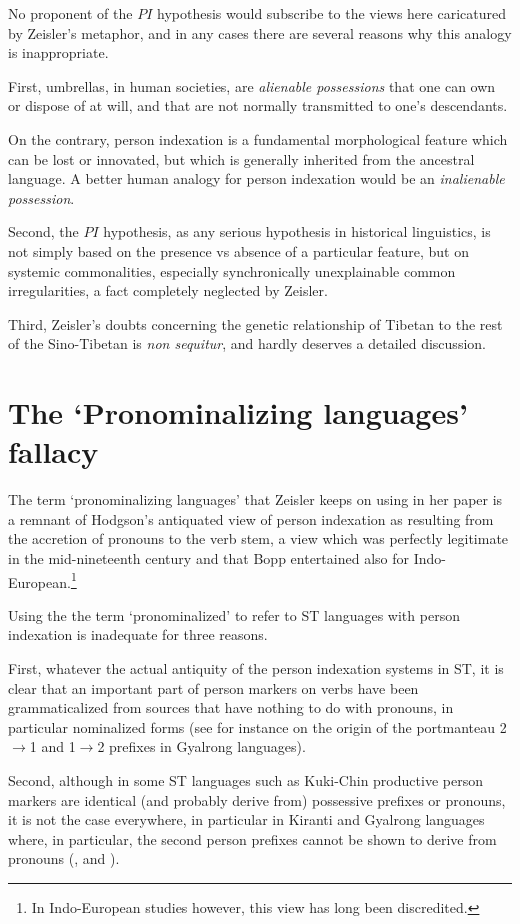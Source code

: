 \documentclass[oldfontcommands,oneside,a4paper,11pt]{article}
\begin{document}
No proponent of the $PI$ hypothesis would subscribe to the views here caricatured by Zeisler's metaphor, and in any cases there are several reasons why this analogy is inappropriate. 

First, umbrellas, in human societies, are \textit{alienable possessions} that one can own or dispose of at will, and that are not normally transmitted to one's descendants.

On the contrary, person indexation is a fundamental morphological feature which can be lost or innovated, but which is generally inherited from the ancestral language. A better human analogy for person indexation would be an \textit{inalienable possession}.

Second, the $PI$ hypothesis, as any serious hypothesis in historical linguistics, is not simply based on the presence vs absence of a particular feature, but on systemic commonalities, especially synchronically unexplainable common irregularities, a fact completely neglected by Zeisler.

Third, Zeisler's doubts concerning the genetic relationship of Tibetan to the rest of the Sino-Tibetan is \textit{non sequitur}, and hardly deserves a detailed discussion.


\section{The `Pronominalizing languages' fallacy}
The term `pronominalizing languages' that Zeisler keeps on using in her paper is a remnant of Hodgson's antiquated view of person indexation as resulting from the accretion of pronouns to the verb stem, a view which was perfectly legitimate in the mid-nineteenth century and that Bopp entertained also for Indo-European.\footnote{In Indo-European studies however, this view has long been discredited. }

Using the the term `pronominalized' to refer to ST languages with person indexation is inadequate for three reasons.

First, whatever the actual antiquity of the person indexation systems in ST, it is clear that an important part of person markers on verbs have been grammaticalized from sources that have nothing to do with pronouns, in particular nominalized forms (see for instance \citealt{jacques15generic} on the origin of the portmanteau 2$\rightarrow$1 and 1$\rightarrow$2 prefixes in Gyalrong languages).

Second, although in some ST languages such as Kuki-Chin productive person markers are identical (and probably derive from) possessive prefixes or pronouns, it is not the case everywhere, in particular in Kiranti and Gyalrong languages where, in particular, the second person prefixes cannot be shown to derive from pronouns (\citealt{jacques12agreement}, \citealt{delancey11prefixes} and \citealt{delancey14second}).
\end{document}
